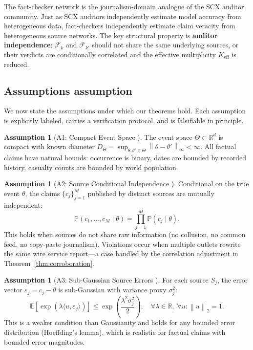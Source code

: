 \documentclass[11pt,a4paper]{article}
\theoremstyle{definition}
\newtheorem{assumption}[theorem]{Assumption}
\newcommand{\SCX}{\textsc{SCX}}
\newcommand{\R}{\mathbb{R}}
\newcommand{\E}{\mathbb{E}}
\newcommand{\Pbb}{\mathbb{P}}
\newcommand{\norm}[1]{\left\lVert#1\right\rVert}
\newcommand{\inner}[2]{\langle #1, #2 \rangle}
\newcommand{\newsState}{\Theta}
\begin{document}
The fact-checker network is the journalism-domain analogue of the \SCX{} auditor community. Just as \SCX{} auditors independently estimate model accuracy from heterogeneous data, fact-checkers independently estimate claim veracity from heterogeneous source networks. The key structural property is \textbf{auditor independence}: $\mathcal{F}_k$ and $\mathcal{F}_{k'}$ should not share the same underlying sources, or their verdicts are conditionally correlated and the effective multiplicity $K_{\mathrm{eff}}$ is reduced.

\subsection{Assumptions assumption}

We now state the assumptions under which our theorems hold. Each assumption is explicitly labeled, carries a verification protocol, and is falsifiable in principle.

\begin{assumption}[A1: Compact Event Space ]
\label{ass:A1}
The event space $\newsState \subset \R^d$ is compact with known diameter $D_\Theta = \sup_{\theta, \theta' \in \newsState} \norm{\theta - \theta'}_\infty < \infty$. All factual claims have natural bounds: occurrence is binary, dates are bounded by recorded history, casualty counts are bounded by world population.
\end{assumption}

\begin{assumption}[A2: Source Conditional Independence ]
\label{ass:A2}
Conditional on the true event $\theta$, the claims $\{c_j\}_{j=1}^{M}$ published by distinct sources are mutually independent:
\begin{equation}
    \Pbb(c_1, \ldots, c_M \mid \theta) = \prod_{j=1}^{M} \Pbb(c_j \mid \theta).
    \label{eq:source_independence}
\end{equation}
This holds when sources do not share raw information (no collusion, no common feed, no copy-paste journalism). Violations occur when multiple outlets rewrite the same wire service report---a case handled by the correlation adjustment in Theorem~\ref{thm:corroboration}.
\end{assumption}

\begin{assumption}[A3: Sub-Gaussian Source Errors ]
\label{ass:A3}
For each source $S_j$, the error vector $\varepsilon_j = c_j - \theta$ is sub-Gaussian with variance proxy $\sigma_j^2$:
\begin{equation}
    \E[\exp(\lambda \inner{u}{\varepsilon_j})] \leq \exp\left(\frac{\lambda^2 \sigma_j^2}{2}\right), \quad \forall \lambda \in \R, \;\forall u: \norm{u}_2 = 1.
    \label{eq:subgaussian}
\end{equation}
This is a weaker condition than Gaussianity and holds for any bounded error distribution (Hoeffding's lemma), which is realistic for factual claims with bounded error magnitudes.
\end{assumption}
\end{document}
